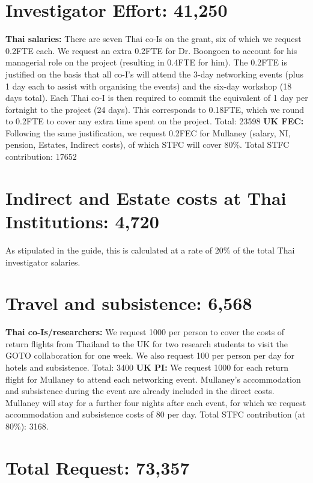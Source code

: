 \documentclass[11pt]{article}
\begin{document}
  \vspace{-3mm}
  \section{Investigator Effort: 41,250}
  \vspace{-3mm}
  {\bf Thai salaries:} There are seven Thai co-Is on the grant, six of which we request 0.2FTE each. We request an extra 0.2FTE for Dr. Boongoen to account for his managerial role on the project (resulting in 0.4FTE for him). The 0.2FTE is justified on the basis that all co-I's will attend the 3-day networking events (plus 1 day each to assist with organising the events) and the six-day workshop (18 days total). Each Thai co-I is then required to commit the equivalent of 1 day per fortnight to the project (24 days). This corresponds to 0.18FTE, which we round to 0.2FTE to cover any extra time spent on the project. Total: 23598 {\bf UK FEC:} Following the same justification, we request 0.2FEC for Mullaney (salary, NI, pension, Estates, Indirect costs), of which STFC will cover 80\%. Total STFC contribution: 17652
  
  \vspace{-3mm}
  \section{Indirect and Estate costs at Thai Institutions: 4,720}
  \vspace{-3mm}
  As stipulated in the guide, this is calculated at a rate of 20\% of the total Thai investigator salaries.
  
  \vspace{-3mm}
  \section{Travel and subsistence: 6,568}
  \vspace{-3mm}
  {\bf Thai co-Is/researchers:} We request 1000 per person to cover the costs of return flights from Thailand to the UK for two research students to visit the GOTO collaboration for one week. We also request 100 per person per day for hotels and subsistence. Total: 3400 {\bf UK PI:} We request 1000 for each return flight for Mullaney to attend each networking event. Mullaney's accommodation and subsistence during the event are already included in the direct costs. Mullaney will stay for a further four nights after each event, for which we request accommodation and subsistence costs of 80 per day. Total STFC contribution (at 80\%): 3168.
  
  \vspace{-3mm}
  \section{Total Request: 73,357}
  
  
\end{document}
